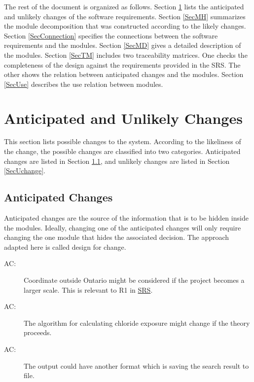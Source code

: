 \documentclass[12pt, titlepage]{article}
\newcounter{acnum}
\newcommand{\actheacnum}{AC\theacnum}
\begin{document}
The rest of the document is organized as follows. Section
\ref{SecChange} lists the anticipated and unlikely changes of the software
requirements. Section \ref{SecMH} summarizes the module decomposition that
was constructed according to the likely changes. Section \ref{SecConnection}
specifies the connections between the software requirements and the
modules. Section \ref{SecMD} gives a detailed description of the
modules. Section \ref{SecTM} includes two traceability matrices. One checks
the completeness of the design against the requirements provided in the SRS. The
other shows the relation between anticipated changes and the modules. Section
\ref{SecUse} describes the use relation between modules.

\section{Anticipated and Unlikely Changes} \label{SecChange}

This section lists possible changes to the system. According to the likeliness
of the change, the possible changes are classified into two
categories. Anticipated changes are listed in Section \ref{SecAchange}, and
unlikely changes are listed in Section \ref{SecUchange}.

\subsection{Anticipated Changes} \label{SecAchange}

Anticipated changes are the source of the information that is to be hidden
inside the modules. Ideally, changing one of the anticipated changes will only
require changing the one module that hides the associated decision. The approach
adapted here is called design for change.

\begin{description}
\item[ \actheacnum \label{acMoreCoordinate}:] Coordinate outside Ontario might be considered if the project becomes a larger scale. This is relevant to R1 in \href{https://github.com/CynthiaLiu0805/BridgeCorrosion/blob/main/docs/SRS/SRS.pdf}{SRS}.
\item[ \actheacnum \label{acAlgorithm}:] The algorithm for calculating chloride exposure might change if the theory proceeds.
\item[ \actheacnum \label{acOutputFile}:] The output could have another format which is saving the search result to file.

\end{description}
\end{document}
